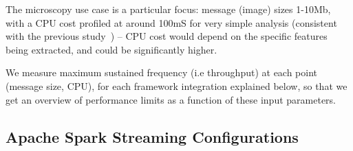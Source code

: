 \documentclass[conference]{IEEEtran}
\begin{document}




The microscopy use case is a particular focus: message (image) sizes 1-10Mb, with a CPU cost profiled at around 100mS for very simple analysis (consistent with the previous study~\cite{torruangwatthanaHarmonicIOScalableData2018}) -- CPU cost would depend on the specific features being extracted, and could be significantly higher.


We measure maximum sustained frequency (i.e throughput) at each point (message size, CPU), for each framework integration explained below, so that we get an overview of performance limits as a function of these input parameters.







\subsection{Apache Spark Streaming Configurations}
\end{document}
